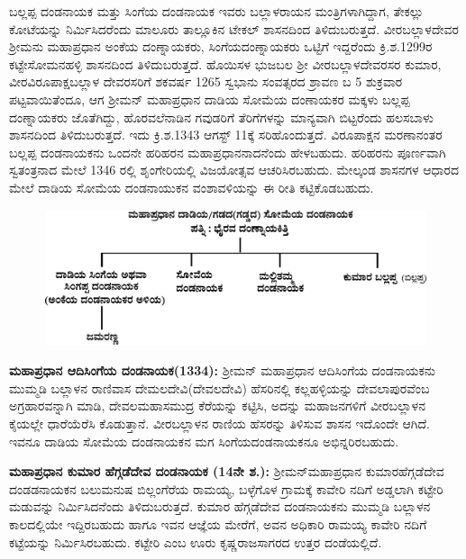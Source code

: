 ಬಲ್ಲಪ್ಪ ದಂಡನಾಯಕ ಮತ್ತು ಸಿಂಗೆಯ ದಂಡನಾಯಕ ಇವರು ಬಲ್ಲಾಳರಾಯನ ಮಂತ್ರಿಗಳಾಗಿದ್ದಾಗ, ತೇಕಲ್ಲು ಕೋಟೆಯನ್ನು ನಿರ್ಮಿಸಿದರೆಂದು ಮಾಲೂರು ತಾಲ್ಲೂಕಿನ ಟೇಕಲ್​ ಶಾಸನದಿಂದ ತಿಳಿದುಬರುತ್ತದೆ. ವೀರಬಲ್ಲಾಳದೇವರ ಶ‍್ರೀಮನು ಮಹಾಪ್ರಧಾನ ಅಂಕೆಯ ದಂಣ್ನಾಯಕರು, ಸಿಂಗೆಯದಂಣ್ನಾಯಕರು ಒಟ್ಟಿಗೆ ಇದ್ದರೆಂದು ಕ್ರಿ.ಶ.1299ರ ಕಟ್ಟೇಸೋಮನಹಳ್ಳಿ ಶಾಸನದಿಂದ ತಿಳಿದುಬರುತ್ತದೆ. ಹೊಯಿಸಳ ಭುಜಬಲ ಶ‍್ರೀ ವೀರಬಲ್ಲಾಳದೇವರಸರ ಕುಮಾರ, ವೀರವಿರೂಪಾಕ್ಷಬಲ್ಲಾಳ ದೇವರಸರಿಗೆ ಶಕವರ್ಷ 1265 ಸ್ವಭಾನು ಸಂವತ್ಸರದ ಶ್ರಾವಣ ಬ 5 ಶುಕ್ರವಾರ ಪಟ್ಟವಾಯಿತೆಂದೂ, ಆಗ ಶ‍್ರೀಮನ್​ ಮಹಾಪ್ರಧಾನ ದಾಡಿಯ ಸೋಮೆಯ ದಂಣಾಯಕರ ಮಕ್ಕಳು ಬಲ್ಲಪ್ಪ ದಂಣ್ನಾಯಕರು ಜೊತೆಗಿದ್ದು, ಹೊರವಲೆನಾಡಿನ ಗವುಡರಿಗೆ ತೆರಿಗೆಗಳನ್ನು ಮಾನ್ಯವಾಗಿ ಬಿಟ್ಟರೆಂದು ಹಲಸಬಾಳು ಶಾಸನದಿಂದ ತಿಳಿದುಬರುತ್ತದೆ. ಇದು ಕ್ರಿ.ಶ.1343 ಆಗಸ್ಟ್​ 11ಕ್ಕೆ ಸರಿಹೊಂದುತ್ತದೆ. ವಿರೂಪಾಕ್ಷನ ಮರಣಾನಂತರ ಬಲ್ಲಪ್ಪ ದಂಡನಾಯಕನು ಒಂದನೇ ಹರಿಹರನ ಮಹಾಪ್ರಧಾನನಾದನೆಂದು ಹೇಳಬಹುದು. ಹರಿಹರನು ಪೂರ್ಣವಾಗಿ ಸ್ವತಂತ್ರನಾದ ಮೇಲೆ 1346 ರಲ್ಲಿ ಶೃಂಗೇರಿಯಲ್ಲಿ ವಿಜಯೋತ್ಸವ ಆಚರಿಸಿರಬಹುದು. ಮೇಲ್ಕಂಡ ಶಾಸನಗಳ ಆಧಾರದ ಮೇಲೆ ದಾಡಿಯ ಸೋಮೆಯ ದಂಡನಾಯುಕನ ವಂಶಾವಳಿಯನ್ನು ಈ ರೀತಿ ಕಟ್ಟಿಕೊಡ\-ಬಹುದು.

\begin{figure}[!h]
\includegraphics[scale=1.15]{images/chap3/chap3fig25.jpeg}
\end{figure}

\textbf{ಮಹಾಪ್ರಧಾನ ಆದಿಸಿಂಗೆಯ ದಂಡನಾಯಕ(1334):} ಶ‍್ರೀಮನ್​ ಮಹಾಪ್ರಧಾನ ಆದಿಸಿಂಗೆಯ ದಂಡನಾಯಕನು ಮುಮ್ಮಡಿ ಬಲ್ಲಾಳನ ರಾಣಿವಾಸ ದೇಮಲದೇವಿ(ದೇವಲದೇವಿ) ಹೆಸರಿನಲ್ಲಿ ಕಲ್ಲಹಳ್ಳಿಯನ್ನು ದೇವಲಾಪುರವೆಂಬ ಅಗ್ರಹಾರ\-ವನ್ನಾಗಿ ಮಾಡಿ, ದೇವಲಮಹಾಸಮುದ್ರ ಕೆರೆಯನ್ನು ಕಟ್ಟಿಸಿ, ಅದನ್ನು ಮಹಾಜನಗಳಿಗೆ ವೀರಬಲ್ಲಾಳನ ಕೈಯಲ್ಲೇ ಧಾರೆಯೆರೆಸಿ ಕೊಡುತ್ತಾನೆ. ವೀರಬಲ್ಲಾಳನ ರಾಣಿಯ ಹೆಸರನ್ನು ತಿಳಿಸುವ ಶಾಸನ ಇದೊಂದೇ ಆಗಿದೆ. ಇವನೂ ದಾಡಿಯ ಸೋಮೆಯ ದಂಡನಾಯಕನ ಮಗ ಸಿಂಗೆಯದಂಡನಾಯಕನೂ ಅಭಿನ್ನರಿರಬಹುದು.

\textbf{ಮಹಾಪ್ರಧಾನ ಕುಮಾರ ಹೆಗ್ಗಡೆದೇವ ದಂಡನಾಯಕ (14ನೇ ಶ.):} ಶ‍್ರೀಮನ್​ ಮಹಾಪ್ರಧಾನ ಕುಮಾರಹೆಗ್ಗಡೆದೇವ ದಂಡಡನಾಯಕನ ಬಲುಮನುಷ ಬಿಲ್ಲಂಗೆರೆಯ ರಾಮಯ್ಯ, ಬಳ್ಳೆಗೊಳ ಗ್ರಾಮಕ್ಕೆ ಕಾವೇರಿ ನದಿಗೆ ಅಡ್ಡಲಾಗಿ ಕಟ್ಟೇರಿ ಮಡುವನ್ನು ನಿರ್ಮಿಸಿದನೆಂದು ತಿಳಿದುಬರುತ್ತದೆ. ಕುಮಾರ ಹೆಗ್ಗಡೆದೇವ ದಂಡನಾಯಕನು ಮುಮ್ಮಡಿ ಬಲ್ಲಾಳನ ಕಾಲದಲ್ಲಿಯೇ ಇದ್ದಿರಬಹುದು ಹಾಗೂ ಇವನ ಆಜ್ಞೆಯ ಮೇರೆಗೆ, ಅವನ ಅಧಿಕಾರಿ ರಾಮಯ್ಯ ಕಾವೇರಿ ನದಿಗೆ ಕಟ್ಟೆಯನ್ನು ನಿರ್ಮಿಸಿರಬಹುದು. ಕಟ್ಟೇರಿ ಎಂಬ ಊರು ಕೃಷ್ಣರಾಜಸಾಗರದ ಉತ್ತರ ದಂಡೆಯಲ್ಲಿದೆ.

